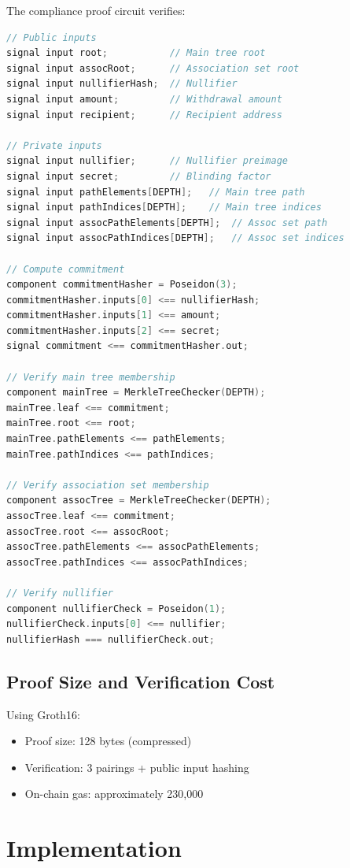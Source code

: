 \documentclass[11pt,a4paper]{article}
\theoremstyle{definition}
\begin{document}
The compliance proof circuit verifies:

\begin{lstlisting}[language=C,basicstyle=\ttfamily\small]
// Public inputs
signal input root;           // Main tree root
signal input assocRoot;      // Association set root
signal input nullifierHash;  // Nullifier
signal input amount;         // Withdrawal amount
signal input recipient;      // Recipient address

// Private inputs
signal input nullifier;      // Nullifier preimage
signal input secret;         // Blinding factor
signal input pathElements[DEPTH];   // Main tree path
signal input pathIndices[DEPTH];    // Main tree indices
signal input assocPathElements[DEPTH];  // Assoc set path
signal input assocPathIndices[DEPTH];   // Assoc set indices

// Compute commitment
component commitmentHasher = Poseidon(3);
commitmentHasher.inputs[0] <== nullifierHash;
commitmentHasher.inputs[1] <== amount;
commitmentHasher.inputs[2] <== secret;
signal commitment <== commitmentHasher.out;

// Verify main tree membership
component mainTree = MerkleTreeChecker(DEPTH);
mainTree.leaf <== commitment;
mainTree.root <== root;
mainTree.pathElements <== pathElements;
mainTree.pathIndices <== pathIndices;

// Verify association set membership
component assocTree = MerkleTreeChecker(DEPTH);
assocTree.leaf <== commitment;
assocTree.root <== assocRoot;
assocTree.pathElements <== assocPathElements;
assocTree.pathIndices <== assocPathIndices;

// Verify nullifier
component nullifierCheck = Poseidon(1);
nullifierCheck.inputs[0] <== nullifier;
nullifierHash === nullifierCheck.out;
\end{lstlisting}

\subsection{Proof Size and Verification Cost}

Using Groth16:
\begin{itemize}
    \item Proof size: 128 bytes (compressed)
    \item Verification: 3 pairings + public input hashing
    \item On-chain gas: approximately 230,000
\end{itemize}

\section{Implementation}
\end{document}
